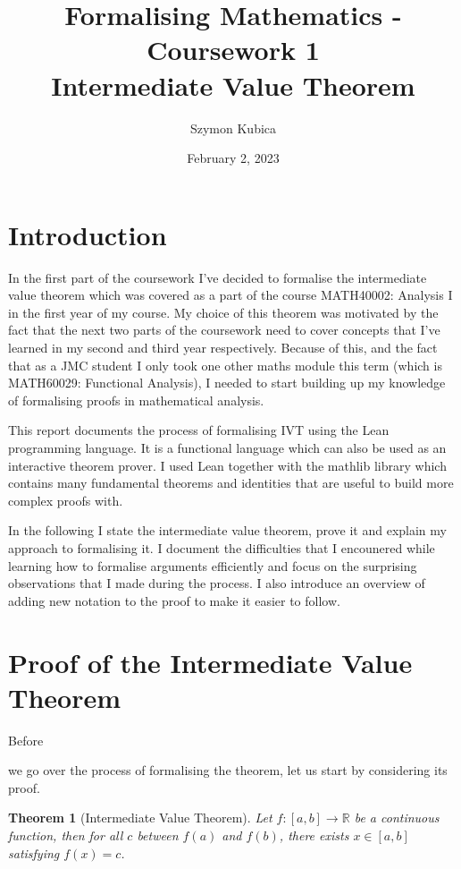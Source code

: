 \documentclass[11pt]{article}
\newcommand\R{\mathbb{R}}
\newtheorem*{theorem}{Theorem}
\begin{document}
\title{Formalising Mathematics - Coursework 1 \\ Intermediate Value Theorem}
\date{February 2, 2023}
\author{Szymon Kubica}
\maketitle

\section*{ Introduction }

In the first part of the coursework I've decided to formalise the intermediate
value theorem which was covered as a part of the course MATH40002: Analysis I
in the first year of my course. My choice of this theorem was motivated by
the fact that the next two parts of the coursework need to cover concepts that
I've learned in my second and third year respectively. Because of
this, and the fact that as a JMC student I only took one other maths module this
term (which is MATH60029: Functional Analysis), I needed to start building up my
knowledge of formalising proofs in mathematical analysis.

This report documents the process of formalising IVT using the Lean programming
language. It is a functional language which can also be used as an interactive
theorem prover. I used Lean together with the mathlib library which contains many
fundamental theorems and identities that are useful to build more complex proofs
with.

In the following I state the intermediate value theorem, prove it and
explain my approach to formalising it. I document the
difficulties that I encounered while learning how to formalise arguments
efficiently and focus on the surprising observations that I made during the process.
I also introduce an overview of adding new notation to the proof to make it
easier to follow.


\section*{ Proof of the Intermediate Value Theorem }

\hypertarget{statement}{Before} we go over the process of formalising the theorem, let us start by
considering its proof.
\begin{theorem}[Intermediate Value Theorem]
  Let $f : [a, b] \to \R  $ be a continuous function, then for all $c$ between
  $f(a)$ and $f(b)$, there exists $x \in [a, b] $ satisfying $f(x) = c$.
\end{theorem}
\end{document}
